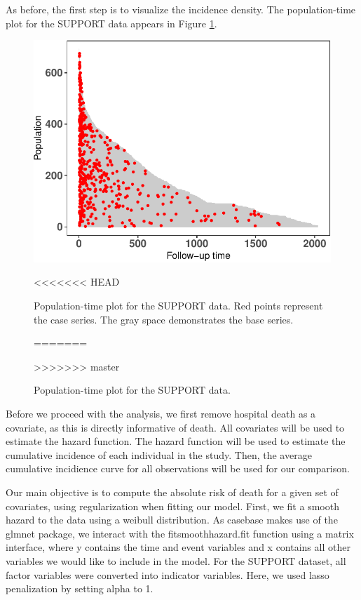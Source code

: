 \documentclass[
]{jss}
\begin{document}
As before, the first step is to visualize the incidence density. The
population-time plot for the SUPPORT data appears in Figure
\ref{fig:support-poptime}.

\begin{CodeChunk}
\begin{figure}

{\centering \includegraphics{../figures/support-poptime-1} 

}

<<<<<<< HEAD
\caption{\label{fig:support-poptime} Population-time plot for the SUPPORT data. Red points represent the case series. The gray space demonstrates the base series.}\label{fig:support-poptime}
=======
\caption{\label{fig:support-poptime} Population-time plot for the SUPPORT data.}\label{fig:support-poptime}
>>>>>>> master
\end{figure}
\end{CodeChunk}

Before we proceed with the analysis, we first remove hospital death as a
covariate, as this is directly informative of death. All covariates will
be used to estimate the hazard function. The hazard function will be
used to estimate the cumulative incidence of each individual in the
study. Then, the average cumulative incidience curve for all
observations will be used for our comparison.

Our main objective is to compute the absolute risk of death for a given
set of covariates, using regularization when fitting our model. First,
we fit a smooth hazard to the data using a weibull distribution. As
casebase makes use of the glmnet package, we interact with the
fitsmoothhazard.fit function using a matrix interface, where y contains
the time and event variables and x contains all other variables we would
like to include in the model. For the SUPPORT dataset, all factor
variables were converted into indicator variables. Here, we used lasso
penalization by setting alpha to 1.
\end{document}
